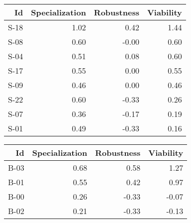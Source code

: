 


\begin{tabular}{ | r | r | r | r | }
    \hline
                    Id  &  Specialization  &      Robustness  &       Viability  \\
    \hline
    \hline
                  S-18  &            1.02  &            0.42  &            1.44  \\
    \hline
                  S-08  &            0.60  &           -0.00  &            0.60  \\
    \hline
                  S-04  &            0.51  &            0.08  &            0.60  \\
    \hline
                  S-17  &            0.55  &            0.00  &            0.55  \\
    \hline
                  S-09  &            0.46  &            0.00  &            0.46  \\
    \hline
                  S-22  &            0.60  &           -0.33  &            0.26  \\
    \hline
                  S-07  &            0.36  &           -0.17  &            0.19  \\
    \hline
                  S-01  &            0.49  &           -0.33  &            0.16  \\
    \hline
\end{tabular}


\begin{tabular}{ | r | r | r | r | }
    \hline
                    Id  &  Specialization  &      Robustness  &       Viability  \\
    \hline
    \hline
                  B-03  &            0.68  &            0.58  &            1.27  \\
    \hline
                  B-01  &            0.55  &            0.42  &            0.97  \\
    \hline
                  B-00  &            0.26  &           -0.33  &           -0.07  \\
    \hline
                  B-02  &            0.21  &           -0.33  &           -0.13  \\
    \hline
\end{tabular}


